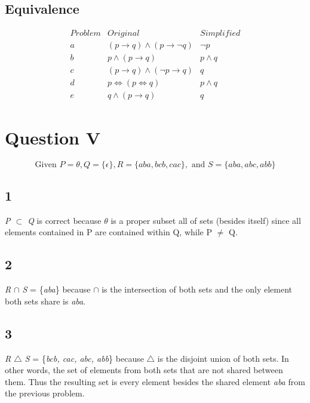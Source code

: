 \documentclass{article}
\begin{document}
\subsection*{Equivalence}
\begin{displaymath}
\begin{array}{c|c|c} %
Problem & Original & Simplified \\
\hline
a & (p \rightarrow q) \land (p \rightarrow \neg q) & \neg p \\ 
b & p \land (p \rightarrow q) & p \land q \\
c & (p \rightarrow q) \land (\neg p \rightarrow q) & q \\
d & p \iff (p \iff q) & p \land q \\
e & q \land (p \rightarrow q) & q
\end{array}
\end{displaymath}

\section*{Question V}

\[ \textrm{Given } P = \theta, Q=\{\epsilon\}, R=\{aba, bcb, cac\}, \textrm{ and } S=\{aba, abc, abb\}\]

\subsection{1}
\textit{P $\subset$ Q} is correct because $\theta$ is a proper subset all of sets (besides itself) since all elements contained in P are contained within Q, while P $\neq$ Q.

\subsection{2}
\textit{R $\cap$ S} = \{\textit{aba}\} because $\cap$ is the intersection of both sets and the only element both sets share is \textit{aba}.

\subsection{3}
\textit{R $\triangle$ S} = \{\textit{bcb, cac, abc, abb}\} because $\triangle$ is the disjoint union of both sets. In other words, the set of elements from both sets that are not shared between them. Thus the resulting set is every element besides the shared element \textit{aba} from the previous problem.
\end{document}

